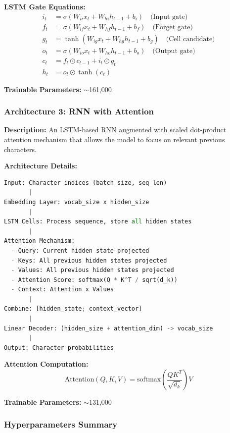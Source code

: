 \documentclass[12pt,a4paper]{article}
\begin{document}
\textbf{LSTM Gate Equations:}
\begin{align}
    i_t &= \sigma(W_{ii}x_t + W_{hi}h_{t-1} + b_i) \quad \text{(Input gate)} \\
    f_t &= \sigma(W_{if}x_t + W_{hf}h_{t-1} + b_f) \quad \text{(Forget gate)} \\
    g_t &= \tanh(W_{ig}x_t + W_{hg}h_{t-1} + b_g) \quad \text{(Cell candidate)} \\
    o_t &= \sigma(W_{io}x_t + W_{ho}h_{t-1} + b_o) \quad \text{(Output gate)} \\
    c_t &= f_t \odot c_{t-1} + i_t \odot g_t \\
    h_t &= o_t \odot \tanh(c_t)
\end{align}

\textbf{Trainable Parameters:} $\sim$161,000

\subsubsection{Architecture 3: RNN with Attention}

\textbf{Description:}
An LSTM-based RNN augmented with scaled dot-product attention mechanism that allows the model to focus on relevant previous characters.

\textbf{Architecture Details:}
\begin{lstlisting}[language=Python, caption=RNN with Attention Architecture]
Input: Character indices (batch_size, seq_len)
       |
Embedding Layer: vocab_size x hidden_size
       |
LSTM Cells: Process sequence, store all hidden states
       |
Attention Mechanism:
  - Query: Current hidden state projected
  - Keys: All previous hidden states projected
  - Values: All previous hidden states projected
  - Attention Score: softmax(Q * K^T / sqrt(d_k))
  - Context: Attention x Values
       |
Combine: [hidden_state; context_vector]
       |
Linear Decoder: (hidden_size + attention_dim) -> vocab_size
       |
Output: Character probabilities
\end{lstlisting}

\textbf{Attention Computation:}
\begin{equation}
    \text{Attention}(Q, K, V) = \text{softmax}\left(\frac{QK^T}{\sqrt{d_k}}\right)V
\end{equation}

\textbf{Trainable Parameters:} $\sim$131,000

\subsubsection{Hyperparameters Summary}
\end{document}
